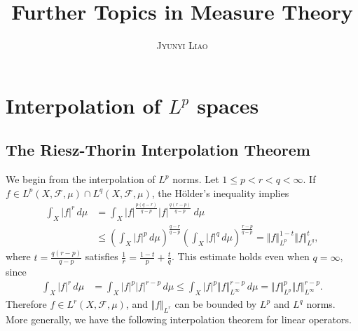 \documentclass{article}
\title{\bf Further Topics in Measure Theory}
\author{\textsc{Jyunyi Liao}}
\date{}
\numberwithin{equation}{section}
\newcommand{\scr}{\mathscr}
\theoremstyle{plain}
\theoremstyle{definition}
\begin{document}
\maketitle
\tableofcontents
	
\newpage

\section{Interpolation of $L^p$ spaces}
\subsection{The Riesz-Thorin Interpolation Theorem}
We begin from the interpolation of $L^p$ norms. Let $1\leq p<r<q<\infty$. If $f\in L^p(X,\scr{F},\mu)\cap L^q(X,\scr{F},\mu)$, the Hölder's inequality implies
\begin{align*}
	\int_X\vert f\vert^r\,d\mu&=\int_X\vert f\vert^\frac{p(q-r)}{q-p}\vert f\vert^\frac{q(r-p)}{q-p}\,d\mu\\
	&\leq\left(\int_X\vert f\vert^p\,d\mu\right)^{\frac{q-r}{q-p}}\left(\int_X\vert f\vert^q\,d\mu\right)^{\frac{r-p}{q-p}}=\Vert f\Vert_{L^p}^{1-t}\Vert f\Vert_{L^q}^{t},
\end{align*}
where $t=\frac{q(r-p)}{q-p}$ satisfies $\frac{1}{r}=\frac{1-t}{p}+\frac{t}{q}$. This estimate holds even when $q=\infty$, since
\begin{align*}
	\int_X\vert f\vert^r\,d\mu&=\int_X\vert f\vert^p\vert f\vert^{r-p}\,d\mu
	\leq\int_X\vert f\vert^p\Vert f\Vert^{r-p}_{L^\infty}\,d\mu=\Vert f\Vert^p_{L^p}\Vert f\Vert^{r-p}_{L^\infty}.
\end{align*}
Therefore $f\in L^r(X,\scr{F},\mu)$, and $\Vert f\Vert_{L^r}$ can be bounded by $L^p$ and $L^q$ norms. More generally, we have the following interpolation theorem for linear operators.
\end{document}
